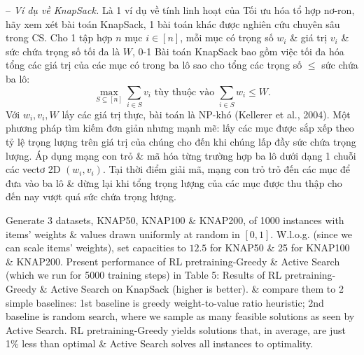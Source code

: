\documentclass{article}
\begin{document}
\begin{itemize}
\begin{enumerate}
        -- {\it Ví dụ về KnapSack.} Là 1 ví dụ về tính linh hoạt của Tối ưu hóa tổ hợp nơ-ron, hãy xem xét bài toán KnapSack, 1 bài toán khác được nghiên cứu chuyên sâu trong CS. Cho 1 tập hợp $n$ mục $i\in[n]$, mỗi mục có trọng số $w_i$ \& giá trị $v_i$ \& sức chứa trọng số tối đa là $W$, 0-1 Bài toán KnapSack bao gồm việc tối đa hóa tổng các giá trị của các mục có trong ba lô sao cho tổng các trọng số $\le$ sức chứa ba lô:
        \begin{equation*}
        \max_{S\subseteq[n]} \sum_{i\in S} v_i\mbox{ tùy thuộc vào }\sum_{i\in S} w_i\le W.
        \end{equation*}
        Với $w_i,v_i,W$ lấy các giá trị thực, bài toán là NP-khó (Kellerer et al., 2004). Một phương pháp tìm kiếm đơn giản nhưng mạnh mẽ: lấy các mục được sắp xếp theo tỷ lệ trọng lượng trên giá trị của chúng cho đến khi chúng lấp đầy sức chứa trọng lượng. Áp dụng mạng con trỏ \& mã hóa từng trường hợp ba lô dưới dạng 1 chuỗi các vectơ 2D $(w_i,v_i)$. Tại thời điểm giải mã, mạng con trỏ trỏ đến các mục để đưa vào ba lô \& dừng lại khi tổng trọng lượng của các mục được thu thập cho đến nay vượt quá sức chứa trọng lượng.
        
        Generate 3 datasets, KNAP50, KNAP100 \& KNAP200, of 1000 instances with items' weights \& values drawn uniformly at random in $[0,1]$. W.l.o.g. (since we can scale items' weights), set capacities to $12.5$ for KNAP50 \& 25 for KNAP100 \& KNAP200. Present performance of RL pretraining-Greedy \& Active Search (which we run for 5000 training steps) in {\sf Table 5: Results of RL pretraining-Greedy \& Active Search on KnapSack (higher is better).} \& compare them to 2 simple baselines: 1st baseline is greedy weight-to-value ratio heuristic; 2nd baseline is random search, where we sample as many feasible solutions as seen by Active Search. RL pretraining-Greedy yields solutions that, in average, are just 1\% less than optimal \& Active Search solves all instances to optimality.
        

\end{enumerate}
\end{itemize}
\end{document}
